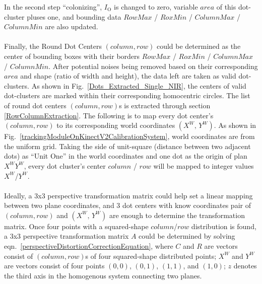 %
In the second step \enquote{colonizing},  \(I_{\text{O}}\) is changed to zero, variable \(area\) of this dot-cluster pluses one, and bounding data \(RowMax\) / \(RoxMin\) / \(ColumnMax\) / \(ColumnMin\) are also updated.%
\\\\%
Finally, the Round Dot Centers \((column, row)\) could be determined as the center of bounding boxes with their borders \(RowMax\) / \(RoxMin\) / \(ColumnMax\) / \(ColumnMin\). After potential noises being removed based on their corresponding \(area\) and shape (ratio of width and height), the data left are taken as valid dot-clusters. As shown in Fig.~\ref{Dots_Extracted_Single_NIR}, the centers of valid dot-clusters are marked within their corresponding homocentric circles.
%
%
\label{uniformGridFittingXY}
%
The list of round dot centers \((column, row)\)s is extracted through section \ref{RowColumnExtraction}. The following is to map every dot center's \((column, row)\) to its corresponding world coordinates \((X^W, \,Y^W)\). As shown in Fig.~\ref{trackingModuleOnKinectV2CalibrationSystem}, world coordinates are from the uniform grid. Taking the side of unit-square (distance between two adjacent dots) as \enquote{Unit One} in the world coordinates and one dot as the origin of plan \(X^WY^W\), every dot cluster's center \(column\) / \(row\) will be mapped to integer values \(X^W\)/\(Y^W\). %
\\\\%
Ideally, a 3x3 perspective transformation matrix could help set a linear mapping between two plane coordinates, and 3 dot centers with know coordinates pair of \((column, row)\) and \((X^W, \,Y^W)\) are enough to determine the transformation matrix. Once four points with a squared-shape \(column\)/\(row\) distribution is found, a 3x3 perspective transformation matrix \(A\) could be determined by solving eqn.~\ref{perspectiveDistortionCorrectionEquation}, %
where \(C\) and \(R\) are vectors consist of \((column, row)\)s of four squared-shape distributed points; \(X^W\) and \(Y^W\) are vectors consist of four points \((0, 0)\), \((0, 1)\), \((1, 1)\), and \((1, 0)\); \(z\) denotes the third axis in the homogenous system connecting two planes. %
\\\\%
